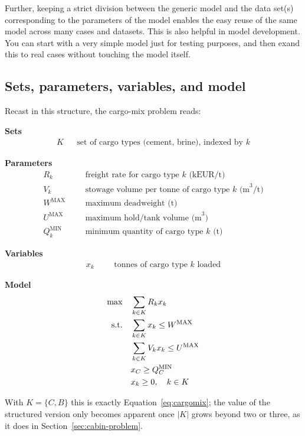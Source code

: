 Further, keeping a strict division between the generic model and the data set(s) corresponding to the parameters of the model enables the easy reuse of the same model across many cases and datasets. This is also helpful in model development. You can start with a very simple model just for testing purposes, and then exand this to real cases without touching the model itself.

\subsection{Sets, parameters, variables, and model}

Recast in this structure, the cargo-mix problem reads:

\medskip
\noindent\textbf{Sets}
\begin{align*}
  K  && \text{set of cargo types (cement, brine), indexed by } k
\end{align*}

\noindent\textbf{Parameters}
\begin{align*}
  R_k & && \text{freight rate for cargo type } k \text{ (kEUR/t)} \\
  V_k & && \text{stowage volume per tonne of cargo type } k \text{ (m}^3\text{/t)} \\
  W^{\text{MAX}} & && \text{maximum deadweight (t)} \\
  U^{\text{MAX}} & && \text{maximum hold/tank volume (m}^3\text{)} \\
  Q_k^{\text{MIN}} & && \text{minimum quantity of cargo type } k \text{ (t)}
\end{align*}

\noindent\textbf{Variables}
\begin{align*}
  x_k & && \text{tonnes of cargo type } k \text{ loaded}
\end{align*}

\noindent\textbf{Model}
\begin{align}
  \max \quad & \sum_{k \in K} R_k x_k \notag\\
  \text{s.t.} \quad & \sum_{k \in K} x_k \leq W^{\text{MAX}} \notag\\
  & \sum_{k \in K} V_k x_k \leq U^{\text{MAX}} \notag\\
  & x_C \geq Q_C^{\text{MIN}} \notag\\
  & x_k \geq 0, \quad k \in K \notag
\end{align}

\noindent With $K=\{C,B\}$ this is exactly Equation~\eqref{eq:cargomix};
the value of the structured version only becomes apparent once $|K|$
grows beyond two or three, as it does in Section~\ref{sec:cabin-problem}.

